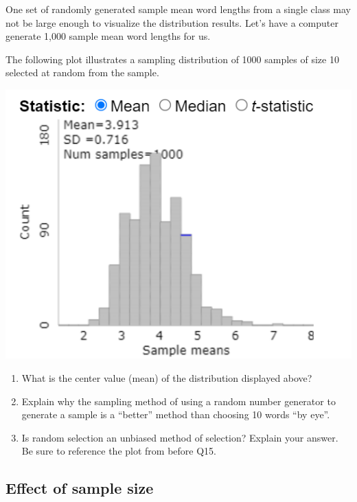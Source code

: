 \documentclass[
]{report}
\begin{document}
\newpage

One set of randomly generated sample mean word lengths from a single class may not be large enough to visualize the distribution results. Let's have a computer generate 1,000 sample mean word lengths for us.

The following plot illustrates a sampling distribution of 1000 samples of size 10 selected at random from the sample.

\begin{center}\includegraphics[width=0.75\linewidth]{images/bencenti_sampling10} \end{center}

\begin{enumerate}
\def\labelenumi{\arabic{enumi}.}
\setcounter{enumi}{8}
\item
  What is the center value (mean) of the distribution displayed above?
  \vspace{0.3in}
\item
  Explain why the sampling method of using a random number generator to generate a sample is a ``better'' method than choosing 10 words ``by eye''.
  \vspace{0.8in}
\item
  Is random selection an unbiased method of selection? Explain your answer. Be sure to reference the plot from before Q15.
  \vspace{0.5in}
\end{enumerate}

\newpage

\subsection*{Effect of sample size}\label{effect-of-sample-size}
\end{document}
